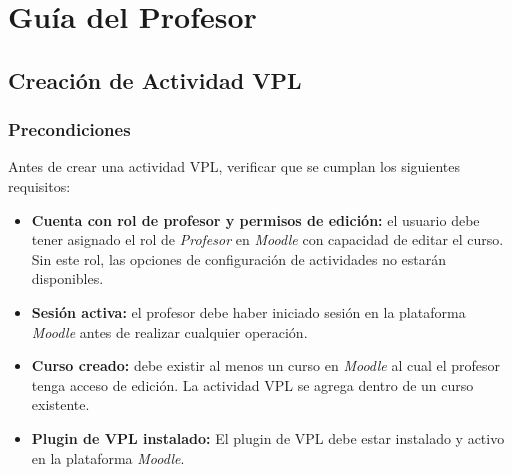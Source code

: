 \documentclass[12pt, a4paper, twoside, openany]{book}
\newcommand{\vpl}{\textsc{VPL}\xspace}
\newcommand{\moodle}{\textit{Moodle}\xspace}
\begin{document}

\part{Guía del Profesor}


\chapter{Creación de Actividad VPL}
\label{ch:crear-actividad}

\section{Precondiciones}
\label{sec:precondiciones-profesor}

Antes de crear una actividad \vpl, verificar que se cumplan los siguientes requisitos:

\begin{itemize}
  \item \textbf{Cuenta con rol de profesor y permisos de edición:} el usuario debe tener asignado el rol de \textit{Profesor} en \moodle con capacidad de editar el curso. Sin este rol, las opciones de configuración de actividades no estarán disponibles.
  \item \textbf{Sesión activa:} el profesor debe haber iniciado sesión en la plataforma \moodle antes de realizar cualquier operación.
  \item \textbf{Curso creado:} debe existir al menos un curso en \moodle al cual el profesor tenga acceso de edición. La actividad \vpl se agrega dentro de un curso existente.
  \item \textbf{Plugin de VPL instalado:} El plugin de VPL debe estar instalado y activo en la plataforma \moodle.
\end{itemize}
\end{document}
